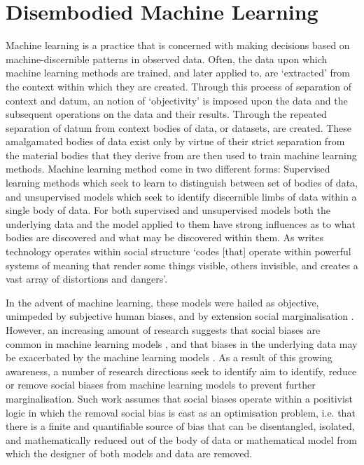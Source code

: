 \section{Disembodied Machine Learning}
Machine learning is a practice that is concerned with making decisions based on machine-discernible patterns in observed data. Often, the data upon which machine learning methods are trained, and later applied to, are `extracted' from the context within which they are created. Through this process of separation of context and datum, an notion of `objectivity' is imposed upon the data and the subsequent operations on the data and their results. Through the repeated separation of datum from context bodies of data, or datasets, are created. These amalgamated bodies of data exist only by virtue of their strict separation from the material bodies that they derive from are then used to train machine learning methods. Machine learning method come in two different forms: Supervised learning methods which seek to learn to distinguish between set of bodies of data, and unsupervised models which seek to identify discernible limbs of data within a single body of data. For both supervised and unsupervised models both the underlying data and the model applied to them have strong influences as to what bodies are discovered and what may be discovered within them. As \citet{Benjamin:2019} writes technology operates within social structure `codes [that] operate within powerful systems of meaning that render some things visible, others invisible, and creates a vast array of distortions and dangers'.\vspace{5mm}

In the advent of machine learning, these models were hailed as objective, unimpeded by subjective human biases, and by extension social marginalisation \citep{oneil:2017}. However, an increasing amount of research suggests that social biases are common in machine learning models \citep{Shah:2020,Buolamwini:2018,Agarwal:2018}, and that biases in the underlying data may be exacerbated by the machine learning models \citep{Zhao:2017,Jia:2020}. As a result of this growing awareness, a number of research directions seek to identify \citep{Shah:2020,Bender-Friedman:2018,Mitchell:2019,Buolamwini:2018} aim to identify, reduce or remove social biases \citep{Zhao:2017,Agarwal:2018,Romanov:2019,Jia:2020} from machine learning models to prevent further marginalisation. Such work assumes that social biases operate within a positivist logic in which the removal social bias is cast as an optimisation problem, i.e. that there is a finite and quantifiable source of bias that can be disentangled, isolated, and mathematically reduced out of the body of data or mathematical model from which the designer of both models and data are removed.

